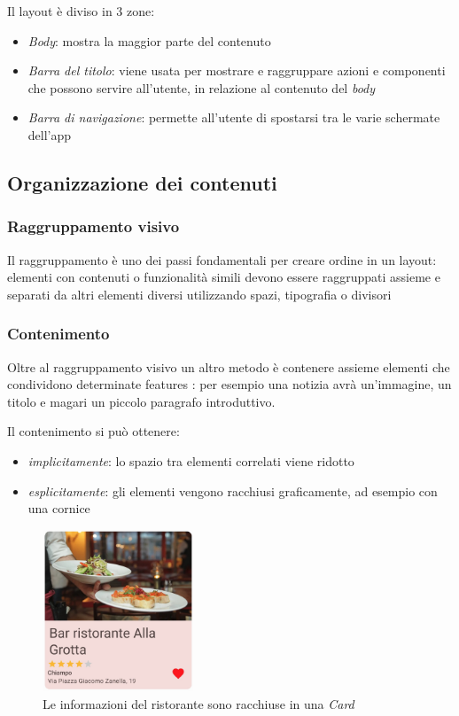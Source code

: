 \documentclass[12pt, a4paper]{report}
\begin{document}
		Il layout è diviso in 3 zone:
		\begin{itemize}
			\item \textit{Body}: mostra la maggior parte del contenuto
			\item \textit{Barra del titolo}: viene usata per mostrare e raggruppare azioni e componenti che
		possono servire all’utente, in relazione al contenuto del \textit{body}
			\item \textit{Barra di navigazione}: permette all'utente di spostarsi tra le varie schermate dell'app
		\end{itemize}

		\subsection{Organizzazione dei contenuti}
			\subsubsection{Raggruppamento visivo}
			Il raggruppamento è uno dei passi fondamentali per creare ordine in un layout: elementi con contenuti o funzionalità simili devono essere raggruppati assieme e separati da altri elementi diversi utilizzando spazi, tipografia o divisori

			\subsubsection{Contenimento}
			Oltre al raggruppamento visivo un altro metodo è contenere assieme elementi che condividono determinate features			\cite{layout_organizzazione}:
			per esempio una notizia avrà un'immagine, un titolo e magari un piccolo paragrafo introduttivo.

			Il contenimento si può ottenere:
			\begin{itemize}
				\item \textit{implicitamente}: lo spazio tra elementi correlati viene ridotto
    			\item \textit{esplicitamente}: gli elementi vengono racchiusi graficamente, ad esempio con una cornice
			\end{itemize}
			
		\begin{figure}[h]
   			\centering
   			\includegraphics[width=0.4\textwidth]{contenimento}
 			\caption{Le informazioni del ristorante sono racchiuse in una \textit{Card}}
    			\label{fig:mesh1}
		\end{figure}
\end{document}
